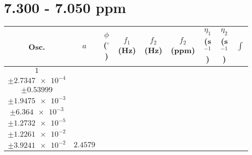 \documentclass[8pt]{article}
\begin{document}
\section*{7.300 - 7.050 ppm}
\begin{longtable}[l]{c c c c c c c c c}
\toprule
Osc. & $a$ & $\phi$ ($^{\circ}$) & $f_1$ (Hz) & $f_2$ (Hz) & $f_2$ (ppm) & $\eta_1$ (s$^{-1}$) & $\eta_2$ (s$^{-1}$) & $\int$\\
\midrule
$\num{1}$ & \begin{tabular}[c]{@{}c@{}}$\num{2.8684e-2}$ \\ $\pm\num{2.7347e-4}$\end{tabular} & \begin{tabular}[c]{@{}c@{}}$\num{-0.54976}$ \\ $\pm\num{0.53999}$\end{tabular} & \begin{tabular}[c]{@{}c@{}}$\num{-7.9106}$ \\ $\pm\num{1.9475e-3}$\end{tabular} & \begin{tabular}[c]{@{}c@{}}$\num{3.5399e+3}$ \\ $\pm\num{6.364e-3}$\end{tabular} & \begin{tabular}[c]{@{}c@{}}$\num{7.0817}$ \\ $\pm\num{1.2732e-5}$\end{tabular} & \begin{tabular}[c]{@{}c@{}}$\num{1.1594}$ \\ $\pm\num{1.2261e-2}$\end{tabular} & \begin{tabular}[c]{@{}c@{}}$\num{4.214}$ \\ $\pm\num{3.9241e-2}$\end{tabular} & $\num{2.4579}$\\

\end{longtable}
\end{document}

